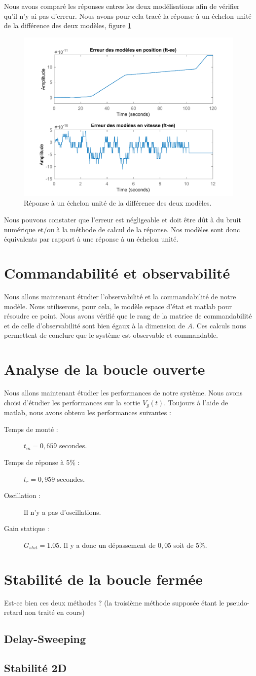 Nous avons comparé les réponses entres les deux modélisations afin de vérifier qu'il n'y ai pas d'erreur. Nous avons pour cela tracé la réponse à un échelon unité de la différence des deux modèles, figure \ref{fig:errFT_EE}
\begin{figure}[!ht]
\centering
\includegraphics[width=.7\textwidth]{./I/images/erreurs_modeles_ft-ee.pdf}
\caption{\label{fig:errFT_EE} Réponse à un échelon unité de la différence des deux modèles.}
\end{figure}
Nous pouvons constater que l'erreur est négligeable et doit être dût à du bruit numérique et/ou à la méthode de calcul de la réponse. Nos modèles sont donc équivalents par rapport à une réponse à un échelon unité.
	\section{Commandabilité et observabilité}
Nous allons maintenant étudier l'observabilité et la commandabilité de notre modèle. Nous utiliserons, pour cela, le modèle espace d'état et matlab pour résoudre ce point. Nous avons vérifié que le rang de la matrice de commandabilité et de celle d'observabilité sont bien égaux à la dimension de $A$. Ces calculs nous permettent de conclure que le système est observable et commandable.
	\section{Analyse de la boucle ouverte}
Nous allons maintenant étudier les performances de notre système. Nous avons choisi d'étudier les performances sur la sortie $V_g(t)$. 
Toujours à l'aide de matlab, nous avons obtenu les performances suivantes : 
\begin{description}
\item[Temps de monté :] $t_m = 0,659 $ secondes.
\item[Temps de réponse à 5\% :] $t_r = 0,959$ secondes.
\item[Oscillation :] Il n'y a pas d'oscillations.
\item[Gain statique :] $G_{stat}= 1.05$. Il y a donc un dépassement de $0,05$ soit de $5\%$.	
\end{description}	
	\section{Stabilité de la boucle fermée}
	Est-ce bien ces deux méthodes ? (la troisième méthode supposée étant le pseudo-retard non traité en cours)
		\subsection{Delay-Sweeping}
		\subsection{Stabilité 2D}


